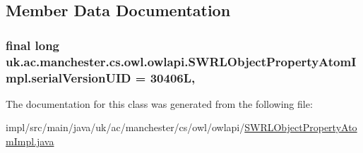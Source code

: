\subsection{Member Data Documentation}
\hypertarget{classuk_1_1ac_1_1manchester_1_1cs_1_1owl_1_1owlapi_1_1_s_w_r_l_object_property_atom_impl_a431bf1433a71c7ac23428ce43fc570fc}{
\subsubsection[{serial\-Version\-U\-I\-D}]{\setlength{\rightskip}{0pt plus 5cm}final long uk.\-ac.\-manchester.\-cs.\-owl.\-owlapi.\-S\-W\-R\-L\-Object\-Property\-Atom\-Impl.\-serial\-Version\-U\-I\-D = 30406\-L\hspace{0.3cm}{\ttfamily [static]}, {\ttfamily [private]}}}\label{classuk_1_1ac_1_1manchester_1_1cs_1_1owl_1_1owlapi_1_1_s_w_r_l_object_property_atom_impl_a431bf1433a71c7ac23428ce43fc570fc}


The documentation for this class was generated from the following file\-:\begin{DoxyCompactItemize}
\item 
impl/src/main/java/uk/ac/manchester/cs/owl/owlapi/\hyperlink{_s_w_r_l_object_property_atom_impl_8java}{S\-W\-R\-L\-Object\-Property\-Atom\-Impl.\-java}\end{DoxyCompactItemize}
